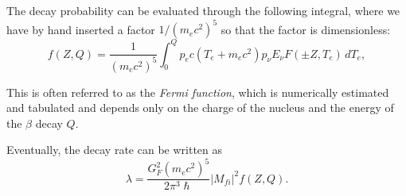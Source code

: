 The decay probability can be evaluated through the following integral, where we have by hand inserted a factor $1/(m_ec^2)^5$ so that the factor is dimensionless:
\begin{equation*}
    f(Z,Q) = \frac{1}{(m_ec^2)^5}\int_0^Q p_e c (T_e + m_e c^2) p_\nu E_\nu F(\pm Z, T_e) \, dT_e,
\end{equation*}

This is often referred to as the \emph{Fermi function}, which is numerically estimated and tabulated and depends only on the charge of the nucleus and the energy of the $\beta$ decay $Q$.

Eventually, the decay rate can be written as
\begin{equation}
\label{BetaDecayRate}
    \lambda = \frac{G_F^2(m_ec^2)^5}{2\pi^3\hslash}|M_{fi}|^2 f(Z,Q).
\end{equation}


